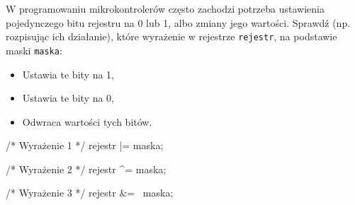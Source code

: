 % 
% 
% 
% 


\dbEntryCheckResults
  W programowaniu mikrokontrolerów często zachodzi potrzeba ustawienia pojedynczego bitu rejestru na 0 lub 1, albo zmiany jego wartości.
  Sprawdź (np. rozpisując ich działanie), które wyrażenie w rejestrze \Verb$rejestr$, na podstawie maski \Verb$maska$:
  \begin{itemize}
  \item Ustawia te bity na 1,
  \item Ustawia te bity na 0,
  \item Odwraca wartości tych bitów.
  \end{itemize}

  \begin{CodeFrame*}[c]{}
    /* Wyrażenie 1 */
    rejestr |= maska;

    /* Wyrażenie 2 */
    rejestr ^= maska;

    /* Wyrażenie 3 */
    rejestr &= ~maska;
    \end{CodeFrame*}
\fi

